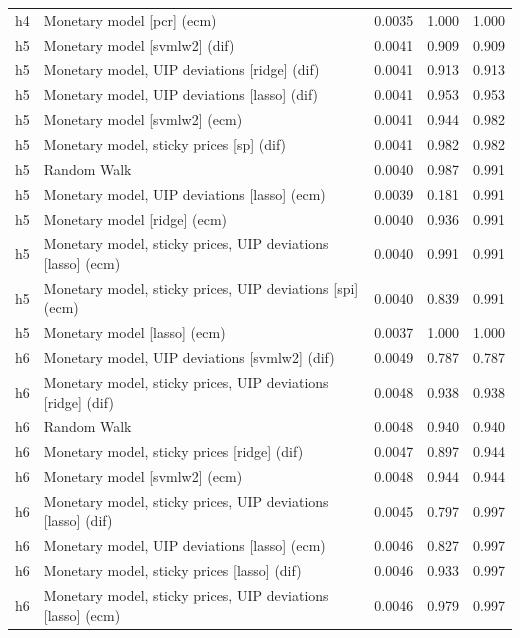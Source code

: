 \begin{ThreePartTable}
\begin{longtable}[t]{cp{5.5cm}ccc}
h4 & \raggedright Monetary model [pcr] (ecm) & 0.0035 & 1.000 & 1.000\\
\addlinespace
h5 & \raggedright Monetary model [svmlw2] (dif) & 0.0041 & 0.909 & 0.909\\
h5 & \raggedright Monetary model, UIP deviations [ridge] (dif) & 0.0041 & 0.913 & 0.913\\
h5 & \raggedright Monetary model, UIP deviations [lasso] (dif) & 0.0041 & 0.953 & 0.953\\
h5 & \raggedright Monetary model [svmlw2] (ecm) & 0.0041 & 0.944 & 0.982\\
h5 & \raggedright Monetary model, sticky prices [sp] (dif) & 0.0041 & 0.982 & 0.982\\
h5 & \raggedright Random Walk & 0.0040 & 0.987 & 0.991\\
h5 & \raggedright Monetary model, UIP deviations [lasso] (ecm) & 0.0039 & 0.181 & 0.991\\
h5 & \raggedright Monetary model [ridge] (ecm) & 0.0040 & 0.936 & 0.991\\
h5 & \raggedright Monetary model, sticky prices, UIP deviations [lasso] (ecm) & 0.0040 & 0.991 & 0.991\\
h5 & \raggedright Monetary model, sticky prices, UIP deviations [spi] (ecm) & 0.0040 & 0.839 & 0.991\\
h5 & \raggedright Monetary model [lasso] (ecm) & 0.0037 & 1.000 & 1.000\\
\addlinespace
h6 & \raggedright Monetary model, UIP deviations [svmlw2] (dif) & 0.0049 & 0.787 & 0.787\\
h6 & \raggedright Monetary model, sticky prices, UIP deviations [ridge] (dif) & 0.0048 & 0.938 & 0.938\\
h6 & \raggedright Random Walk & 0.0048 & 0.940 & 0.940\\
h6 & \raggedright Monetary model, sticky prices [ridge] (dif) & 0.0047 & 0.897 & 0.944\\
h6 & \raggedright Monetary model [svmlw2] (ecm) & 0.0048 & 0.944 & 0.944\\
h6 & \raggedright Monetary model, sticky prices, UIP deviations [lasso] (dif) & 0.0045 & 0.797 & 0.997\\
h6 & \raggedright Monetary model, UIP deviations [lasso] (ecm) & 0.0046 & 0.827 & 0.997\\
h6 & \raggedright Monetary model, sticky prices [lasso] (dif) & 0.0046 & 0.933 & 0.997\\
h6 & \raggedright Monetary model, sticky prices, UIP deviations [lasso] (ecm) & 0.0046 & 0.979 & 0.997\\

\end{longtable}
\end{ThreePartTable}
